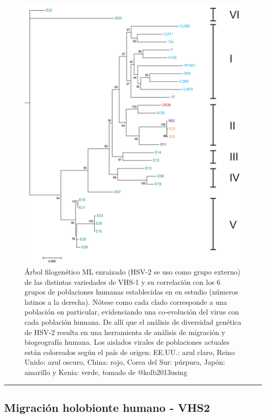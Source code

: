 \documentclass[
  12pt, krantz2,
  spanish,
]{krantz}
\begin{document}
\begin{figure}
\includegraphics[width=0.8\linewidth]{figures/VHS2} \caption{Árbol filogenético ML enraizado (HSV-2 se uso como grupo externo) de las distintas variedades de VHS-1 y su correlación con los 6 grupos de poblaciones humanas establecidas en en estudio (números latinos a la derecha). Nótese como cada clado corresponde a una población en particular, evidenciando una co-evolución del virus con cada población humana. De allí que el análisis de diversidad genética de HSV-2 resulta en  una herramienta de análisis de migración y biogeografía humana. Los aislados virales de poblaciones actuales están coloreados según el país de origen: EE.UU.: azul claro, Reino Unido: azul oscuro, China: rojo, Corea del Sur: púrpura, Japón: amarillo y Kenia: verde, tomado de @kolb2013using}\label{fig:sixcladesroot}
\end{figure}

\begin{center}\rule{0.5\linewidth}{0.5pt}\end{center}

\hypertarget{migraciuxf3n-holobionte-humano---vhs2}{%
\subsection{Migración holobionte humano - VHS2}\label{migraciuxf3n-holobionte-humano---vhs2}}
\end{document}

